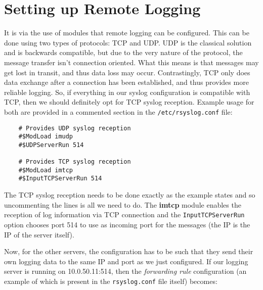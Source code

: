 
\usepackage{minted}
\usepackage{booktabs}


	
		
	\section{Setting up Remote Logging}
	It is via the use of modules that remote logging can be configured. This can be done using two types of protocols: TCP and UDP. UDP is the classical solution and is backwards compatible, but due to the very nature of the protocol, the message transfer isn't connection oriented. What this means is that messages may get lost in transit, and thus data loss may occur. Contrastingly, TCP only does data exchange after a connection has been established, and thus provides more reliable logging. So, if everything in our syslog configuration is compatible with TCP, then we should definitely opt for TCP syslog reception. Example usage for both are provided in a commented section in the \verb|/etc/rsyslog.conf| file:
	
	\vspace{-15pt}
	\begin{verbatim}
	# Provides UDP syslog reception
	#$ModLoad imudp
	#$UDPServerRun 514
	
	# Provides TCP syslog reception
	#$ModLoad imtcp
	#$InputTCPServerRun 514
	\end{verbatim}
	\vspace{-10pt}	
	
	\noindent
	The TCP syslog reception needs to be done exactly as the example states and so uncommenting the lines is all we need to do. The \textbf{imtcp} module enables the reception of log information via TCP connection and the \verb|InputTCPServerRun| option chooses port 514 to use as incoming port for the messages (the IP is the IP of the server itself). 
	
	Now, for the other servers, the configuration has to be such that they send their own logging data to the same IP and port as we just configured. If our logging server is running on 10.0.50.11:514, then the \textit{forwarding rule} configuration (an example of which is present in the \verb|rsyslog.conf| file itself) becomes:
	
